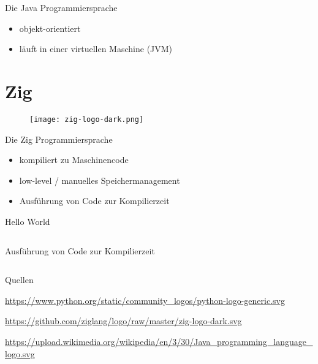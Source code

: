 \documentclass[aspectratio=169]{beamer}
\begin{document}
\begin{frame}{Die Java Programmiersprache}
  \begin{itemize}
  \item objekt-orientiert
  \item läuft in einer virtuellen Maschine (JVM)
  \end{itemize}
\end{frame}

\section{Zig}

\begin{frame}{}
  \begin{figure}
    \centering
    \texttt{[image: zig-logo-dark.png]}
    \caption{\cite{zig_logo}}
    \label{fig:zig_logo}
  \end{figure}
\end{frame}

\begin{frame}{Die Zig Programmiersprache}
  \begin{itemize}
  \item kompiliert zu Maschinencode
  \item low-level / manuelles Speichermanagement
  \item Ausführung von Code zur Kompilierzeit
  \end{itemize}
\end{frame}

\begin{frame}{Hello World}
  \inputminted[linenos]{zig}{examples/hello.zig}
\end{frame}

\begin{frame}{Ausführung von Code zur Kompilierzeit}
  \inputminted[linenos]{zig}{examples/comptime.zig}
\end{frame}

\begin{frame}{Quellen}
  \begin{thebibliography}{}
    \url{https://www.python.org/static/community_logos/python-logo-generic.svg}

    \url{https://github.com/ziglang/logo/raw/master/zig-logo-dark.svg}

    \url{https://upload.wikimedia.org/wikipedia/en/3/30/Java_programming_language_logo.svg}

  \end{thebibliography}
\end{frame}
\end{document}
